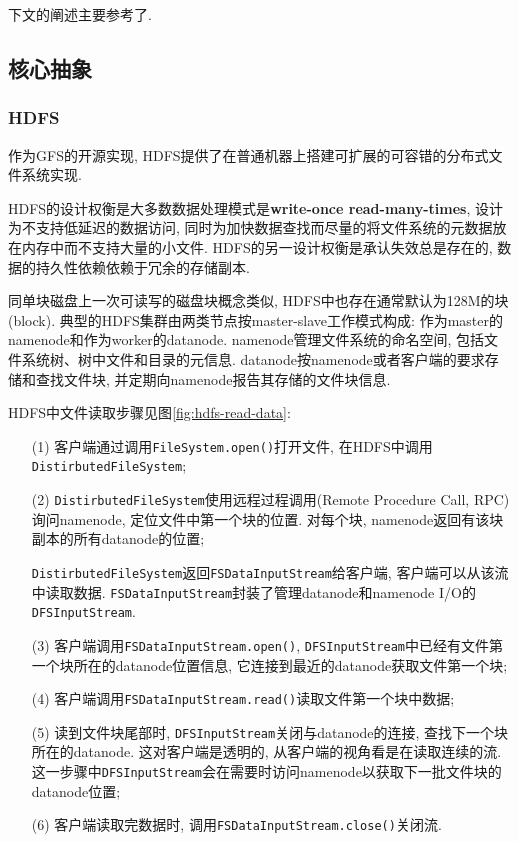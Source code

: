 \documentclass{article}
\begin{document}
下文的阐述主要参考了\cite{hadoop-defnitive-guide}.

\subsection{核心抽象}

\subsubsection{HDFS}

作为GFS\cite{GFS}的开源实现, HDFS提供了在普通机器上搭建可扩展的可容错的分布式文件系统实现. 
 

HDFS的设计权衡是大多数数据处理模式是\textbf{write-once read-many-times}, 设计为不支持低延迟的数据访问, 同时为加快数据查找而尽量的将文件系统的元数据放在内存中而不支持大量的小文件. HDFS的另一设计权衡是承认失效总是存在的, 数据的持久性依赖依赖于冗余的存储副本.

同单块磁盘上一次可读写的磁盘块概念类似, HDFS中也存在通常默认为128M的块(block). 典型的HDFS集群由两类节点按master-slave工作模式构成: 作为master的namenode和作为worker的datanode. namenode管理文件系统的命名空间, 包括文件系统树、树中文件和目录的元信息. datanode按namenode或者客户端的要求存储和查找文件块, 并定期向namenode报告其存储的文件块信息.

HDFS中文件读取步骤见图\ref{fig:hdfs-read-data}:

\begin{enumerate}
\item[(1)] 客户端通过调用\texttt{FileSystem.open()}打开文件, 在HDFS中调用\texttt{DistirbutedFileSystem};
\item[(2)] \texttt{DistirbutedFileSystem}使用远程过程调用(Remote Procedure Call, RPC)询问namenode, 定位文件中第一个块的位置. 对每个块, namenode返回有该块副本的所有datanode的位置;

\texttt{DistirbutedFileSystem}返回\texttt{FSDataInputStream}给客户端, 客户端可以从该流中读取数据. \texttt{FSDataInputStream}封装了管理datanode和namenode I/O的\texttt{DFSInputStream}.


\item[(3)] 客户端调用\texttt{FSDataInputStream.open()}, \texttt{DFSInputStream}中已经有文件第一个块所在的datanode位置信息, 它连接到最近的datanode获取文件第一个块;
\item[(4)] 客户端调用\texttt{FSDataInputStream.read()}读取文件第一个块中数据;
\item[(5)] 读到文件块尾部时, \texttt{DFSInputStream}关闭与datanode的连接, 查找下一个块所在的datanode. 这对客户端是透明的, 从客户端的视角看是在读取连续的流. 这一步骤中\texttt{DFSInputStream}会在需要时访问namenode以获取下一批文件块的datanode位置;
\item[(6)] 客户端读取完数据时, 调用\texttt{FSDataInputStream.close()}关闭流.
\end{enumerate}
\end{document}

